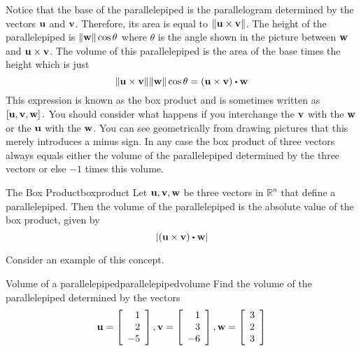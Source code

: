 Notice that the base of the parallelepiped is the parallelogram
determined by the vectors ${\bf u}$ and ${\bf v}$. Therefore, its area is equal to 
$\| {\bf u}\times {\bf v} \| $. The height of the parallelepiped
is $\| {\bf w}\| \cos \theta $ where $\theta $ is the angle
shown in the picture between ${\bf w}$ and ${\bf u}\times {\bf v}$.
The volume of this parallelepiped is the area of the base times
the height which is just
\begin{equation*}
\vectlength \vect{u}\times \vect{v}\vectlength \vectlength \vect{w}\vectlength \cos \theta =
\left( \vect{u}\times\vect{v}\right) \dotprod \vect{w}
\end{equation*}
This expression is known as the box product and is sometimes written as 
$\left[ {\bf u},{\bf v},{\bf w}\right] .$
You should consider what happens if you interchange the 
${\bf v}$ with the ${\bf w}$ or the ${\bf u}$ with the ${\bf w}$.
You can see geometrically from drawing pictures that this merely introduces
a minus sign. In any case the box product of three vectors always equals
either the volume of the parallelepiped determined by the three vectors or
else $-1$ times this volume.

\begin{proposition}{The Box Product}{boxproduct}
Let ${\bf u}, {\bf v}, {\bf w}$ be three vectors in $\mathbb{R}^n$ that define a parallelepiped. Then the volume of the parallelepiped is the absolute value of the box product, given by 
\[
\left| \left(\vect{u}\times\vect{v}\right) \dotprod \vect{w} \right|
\]
\end{proposition}

Consider an example of this concept.

\begin{example}{Volume of a parallelepiped}{parallelepipedvolume}
Find the volume of the parallelepiped determined by the vectors
\begin{equation*}
{\bf u}
=
\left[
\begin{array}{r}
1 \\
2 \\
-5
\end{array}
\right], 
{\bf v}
=
\left[
\begin{array}{r}
1 \\
3 \\
-6
\end{array}
\right], 
{\bf w}
=
\left[
\begin{array}{r}
3 \\
2 \\
3
\end{array}
\right]
\end{equation*}
\end{example}


